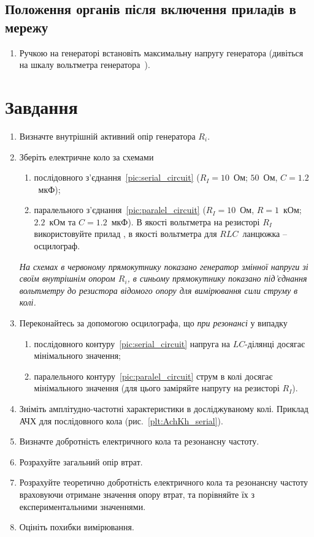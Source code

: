 \subsection*{Положення органів після включення приладів в мережу}

\begin{enumerate}
	\item Ручкою \circled{\ref{btn:regexit}}  на генераторі  встановіть максимальну напругу генератора (дивіться на шкалу вольтметра генератора~\circled{\ref{scale:Vscale}}).
\end{enumerate}

\section{Завдання}

\begin{enumerate}
	\item Визначте внутрішній активний опір генератора $R_i$.
	\item Зберіть електричне коло за схемами
	      \begin{enumerate}[label=\alph*)]
		      \item послідовного з'єднання~\ref{pic:serial_circuit} ($R_I = 10$~Ом; $50$~Ом, $C = 1.2$~мкФ);
		      \item паралельного з'єднання~\ref{pic:paralel_circuit} ($R_I = 10$~Ом, $R = 1$~кОм; $2.2$~кОм та $C = 1.2$~мкФ). В якості вольтметра на резисторі $R_I$ використовуйте прилад , в якості вольтметра для $RLC$~ланцюжка -- осцилограф.
	      \end{enumerate}
	      {\small\itshape На схемах в червоному прямокутнику показано генератор змінної напруги зі своїм внутрішнім опором $R_i$, в синьому прямокутнику показано під'єднання вольтметру до резистора відомого опору для вимірювання сили струму в колі.}
	\item Переконайтесь за допомогою осцилографа, що \emph{при резонансі} у випадку
	      \begin{enumerate}[label=\alph*)]
		      \item послідовного контуру~\ref{pic:serial_circuit}  напруга на $LC$-ділянці досягає мінімального значення;
		      \item паралельного контуру~\ref{pic:paralel_circuit} струм в колі досягає мінімального значення (для цього заміряйте напругу на резисторі $R_I$).
	      \end{enumerate}
	\item Зніміть амплітудно-частотні характеристики в досліджуваному колі. Приклад АЧХ для послідовного кола (рис.~\ref{plt:AchKh_serial}).
	\item Визначте добротність електричного кола та резонансну частоту.
	\item Розрахуйте загальний опір втрат.
	\item Розрахуйте теоретично добротність електричного кола та резонансну частоту враховуючи отримане значення опору втрат, та порівняйте їх з експериментальними значеннями.
	\item Оцініть похибки вимірювання.
\end{enumerate}

